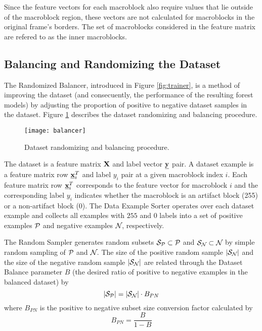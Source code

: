Since the feature vectors for each macroblock also require values that lie outside of the macroblock region, these vectors are not calculated for macroblocks in the original frame's borders. The set of macroblocks considered in the feature matrix are refered to as the inner macroblocks.

\subsection{Balancing and Randomizing the Dataset}
\label{sec:sol_balancer}


The Randomized Balancer, introduced in Figure \ref{fig:trainer}, is a method of improving the dataset (and consecuently, the performance of the resulting forest models) by adjusting the proportion of positive to negative dataset samples in the dataset. Figure \ref{fig:balancer} describes the dataset randomizing and balancing procedure.

\begin{figure} [!h]
  \centering
  
  \texttt{[image: balancer]}
  
  \caption{Dataset randomizing and balancing procedure.}
  \label{fig:balancer}

\end{figure}

\def\DS{\mat{}}
\def\DSF{\mat{X}}
\def\DSL{\vct{y}}
\def\DSE{\mat{DS}_i}
\def\DSP{\set{P}_{\DS}}
\def\DSN{\set{N}_{\DS}}

The dataset is a feature matrix $\DSF$ and label vector $\DSL$ pair. A dataset example is a feature matrix row $\underline{\mathbf{x}}^T_i$ and label $y_i$ pair at a given macroblock index $i$. Each feature matrix row $\underline{\mathbf{x}}^T_i$ corresponds to the feature vector for macroblock $i$ and the corresponding label $y_i$ indicates whether the macroblock is an artifact block (255) or a non-artifact block (0). The Data Example Sorter operates over each dataset example and collects all examples with $255$ and $0$ labels into a set of positive examples $\DSP$ and negative examples $\DSN$, respectively.

\def\DSPS{\set{S}_{\DSP}}
\def\DSNS{\set{S}_{\DSN}}
\def\DSB{B}
\def\BPN{B_{PN}}
\def\DST{T_{\DS}}

The Random Sampler generates random subsets $\DSPS \subset \DSP$ and $\DSNS \subset \DSN$ by simple random sampling \cite{Meng2013} of $\DSP$ and $\DSN$. The size of the positive random sample $|\DSNS|$ and the size of the negative random sample $|\DSNS|$ are related through the Dataset Balance parameter $\DSB$ (the desired ratio of positive to negative examples in the balanced dataset) by
%
\begin{equation}
  \label{eq:pos2neg}
  |\DSPS| = |\DSNS|\cdot\BPN
\end{equation}
%
where $\BPN$ is the positive to negative subset size conversion factor calculated by
%
\begin{equation}
  \label{eq:pos2neg_factor}
  \BPN = \frac{\DSB}{1-\DSB}
\end{equation}

